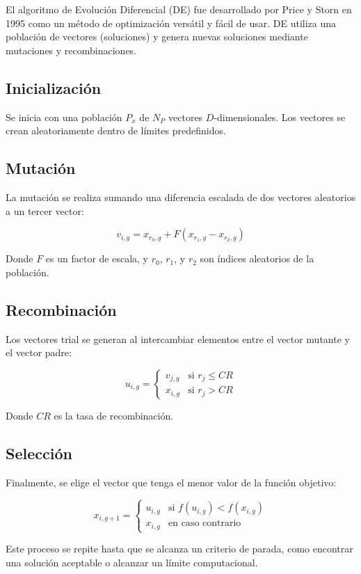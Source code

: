 \documentclass[12pt,titlepage,twoside,openright]{book}
\begin{document}
El algoritmo de Evolución Diferencial (DE) fue desarrollado por Price y Storn en 1995 como un método de optimización versátil y fácil de usar. DE utiliza una población de vectores (soluciones) y genera nuevas soluciones mediante mutaciones y recombinaciones.

\subsection{Inicialización}
Se inicia con una población \(P_x\) de \(N_P\) vectores \(D\)-dimensionales. Los vectores se crean aleatoriamente dentro de límites predefinidos.

\subsection{Mutación}
La mutación se realiza sumando una diferencia escalada de dos vectores aleatorios a un tercer vector:

\[
	v_{i,g} = x_{r_0,g} + F(x_{r_1,g} - x_{r_2,g})
\]

Donde \(F\) es un factor de escala, y \(r_0\), \(r_1\), y \(r_2\) son índices aleatorios de la población.

\subsection{Recombinación}
Los vectores trial se generan al intercambiar elementos entre el vector mutante y el vector padre:

\[
	u_{i,g} =
	\begin{cases}
		v_{j,g} & \text{si } r_j \leq CR \\
		x_{i,g} & \text{si } r_j > CR
	\end{cases}
\]

Donde \(CR\) es la tasa de recombinación.

\subsection{Selección}
Finalmente, se elige el vector que tenga el menor valor de la función objetivo:

\[
	x_{i,g+1} =
	\begin{cases}
		u_{i,g} & \text{si } f(u_{i,g}) < f(x_{i,g}) \\
		x_{i,g} & \text{en caso contrario}
	\end{cases}
\]

Este proceso se repite hasta que se alcanza un criterio de parada, como encontrar una solución aceptable o alcanzar un límite computacional.
\end{document}
